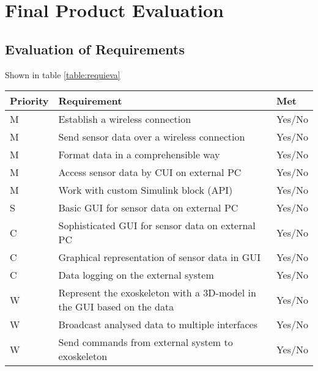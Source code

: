 \chapter{Final Product Evaluation}
\section{Evaluation of Requirements}
Shown in table \ref{table:requieva}\\


{\renewcommand{\arraystretch}{1.5}
	\centering
	\begin{tabular}{ | l | l || l || }
		\hline
		\bfseries{Priority} & \bfseries{Requirement} & \bfseries{Met} \\ \hline
		M & Establish a wireless connection & Yes/No \\ \hline
		M & Send sensor data over a wireless connection & Yes/No \\ \hline
		M & Format data in a comprehensible way & Yes/No \\ \hline
		M & Access sensor data by CUI on external PC & Yes/No \\ \hline
		M & Work with custom Simulink block (API) & Yes/No \\ \hline
		S & Basic GUI for sensor data on external PC & Yes/No \\ \hline
		C & Sophisticated GUI for sensor data on external PC & Yes/No \\ \hline
		C & Graphical representation of sensor data in GUI & Yes/No \\ \hline
		C & Data logging on the external system & Yes/No \\ \hline
		W & Represent the exoskeleton with a 3D-model in the GUI based on the data & Yes/No \\ \hline
		W & Broadcast analysed data to multiple interfaces & Yes/No \\ \hline 
		W & Send commands from external system to exoskeleton & Yes/No \\ \hline 
	\end{tabular}
	\label{table:requieva}
}